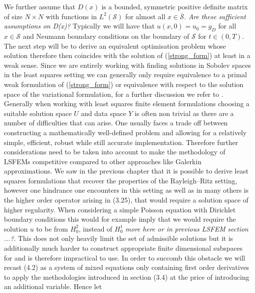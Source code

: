 \documentclass[../draft_1.tex]{subfiles}
\begin{document}
We further assume that $D(x)$ is a bounded, symmetric positive definite matrix of size $N \times N$ with functions in $L^2(\mathcal{S})$ for almost all $ x \in \bar{\mathcal{S}}$. \textit{Are these sufficient assumptions on D(x)?} Typically we will have that $u(x,0) = u_0 = g_D$ for all $ x \in \mathcal{S}$ and Neumann boundary conditions on the boundary of $\mathcal{S}$ for $t \in (0,T)$. 
\smallskip
\\
The next step will be to derive an equivalent optimisation problem whose solution therefore then coincides with the solution of (\ref{strong_form}) at least in a weak sense. Since we are entirely working with finding solutions in Sobolev spaces in the least squares setting we can generally only require equivalence to a primal weak formulation of (\ref{strong_form}) or equivalence with respect to the solution space of the variational formulation, for a further discussion we refer to \cite{bochev2009least}. Generally when working with least squares finite element formulations choosing a suitable solution space $U$ and data space $Y$ is often non trivial as there are a number of difficulties that can arise. One usually faces a trade off between constructing a mathematically well-defined problem and allowing for a relatively simple, efficient, robust while still accurate implementation. Therefore further considerations need to be taken into account to make the methodology of LSFEMs competitive compared to other approaches like Galerkin approximations. We saw in the previous chapter that it is possible to derive least squares formulations that recover the properties of the Rayleigh--Ritz setting, however one hindrance one encounters in this setting as well as in many others is the higher order operator arising in (3.25), that would require a solution space of higher regularity. When considering a simple Poisson equation with Dirichlet boundary conditions this would for example imply that we would require the solution $u$ to be from $H_0^2$, instead of $H_0^1$ \cite{bochev2009least} \textit{more here or in previous LSFEM section ...?}. This does not only heavily limit the set of admissible solutions but it is additionally much harder to construct appropriate finite dimensional subspaces for and is therefore impractical to use. In order to succomb this obstacle we will recast (4.2) as a system of mixed equations only containing first order derivatives to apply the methodologies introduced in section (3.4) at the price of introducing an additional variable. Hence let
\end{document}
